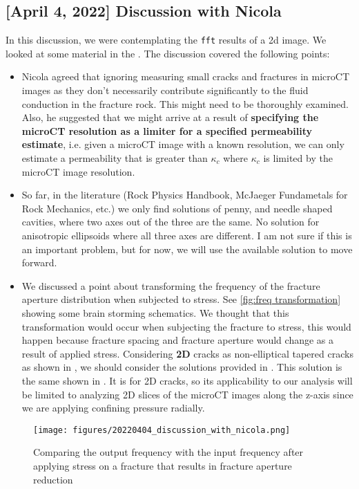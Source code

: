 \documentclass[12pt,titlepage]{article}
\begin{document}
\subsection{[April 4, 2022] Discussion with Nicola}
In this discussion, we were contemplating the \texttt{fft} results of a 2d image. We looked at some material in the \cite[see pages 63-66]{Mavko2009}. The discussion covered the following points: 
\begin{itemize}
\item Nicola agreed that ignoring measuring small cracks and fractures in microCT images as they don't necessarily contribute significantly to the fluid conduction in the fracture rock. This might need to be thoroughly examined. Also, he suggested that we might arrive at a result of \textbf{specifying the microCT resolution as a limiter for a specified permeability estimate}, i.e. given a microCT image with a known resolution, we can only estimate a permeability that is greater than $\kappa_c$ where $\kappa_c$ is limited by the microCT image resolution.
\item So far, in the literature (Rock Physics Handbook, McJaeger Fundametals for Rock Mechanics, etc.) we only find solutions of penny, and needle shaped cavities, where two axes out of the three are the same. No solution for anisotropic ellipsoids where all three axes are different. I am not sure if this is an important problem, but for now, we will use the available solution to move forward.
\item We discussed a point about transforming the frequency of the fracture aperture distribution when subjected to stress. See \autoref{fig:freq transformation} showing some brain storming schematics. We thought that this transformation would occur when subjecting the fracture to stress, this would happen because fracture spacing and fracture aperture would change as a result of applied stress. Considering \textbf{2D} cracks as non-elliptical tapered cracks as shown in \cite[Table 2.9.1 page 64, and Figure 2.9.2 page 66]{Mavko2009}, we should consider the solutions provided in \cite{Mavko1978}. This solution is the same shown in \cite[see pages 63-66]{Mavko2009}. It is for 2D cracks, so its applicability to our analysis will be limited to analyzing 2D slices of the microCT images along the z-axis since we are applying confining pressure radially.

\end{itemize}

\begin{figure}
\centering
\texttt{[image: figures/20220404\_discussion\_with\_nicola.png]}
\caption{Comparing the output frequency with the input frequency after applying stress on a fracture that results in fracture aperture reduction}
\label{fig:freq transformation}
\end{figure}
\end{document}

